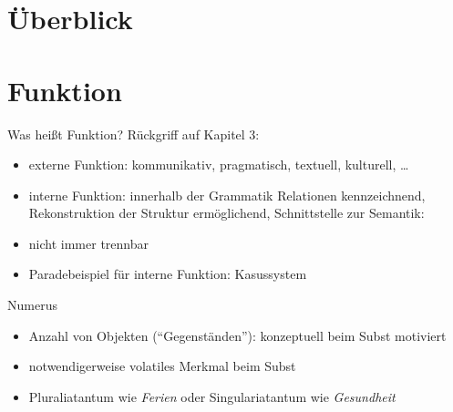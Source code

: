 \section{Überblick}

\section{Funktion}

\begin{frame}
  {Was heißt Funktion?}
  \pause
  Rückgriff auf Kapitel 3:
  \pause
  \Halbzeile
  \begin{itemize}[<+->]
    \item \alert{externe} Funktion: kommunikativ, pragmatisch, textuell, kulturell, \dots
    \item \alert{interne} Funktion: innerhalb der Grammatik Relationen kennzeichnend,
      Rekonstruktion der Struktur ermöglichend, Schnittstelle zur Semantik: 
    \item nicht immer trennbar
      \Halbzeile
    \item Paradebeispiel für interne Funktion: \alert{Kasussystem}
  \end{itemize}
\end{frame}

\begin{frame}
  {Numerus}
  \pause
  \begin{exe}
    \ex
    \begin{xlist}
      \pause
    \end{xlist}
    \pause
    \ex
    \begin{xlist}
      \pause
    \end{xlist}
  \end{exe}
  \pause
  \Halbzeile
  \begin{itemize}[<+->]
    \item \alert{Anzahl von Objekten ("`Gegenständen"')}: konzeptuell beim Subst motiviert
    \item notwendigerweise volatiles Merkmal beim Subst
    \item Pluraliatantum wie \textit{Ferien} oder Singulariatantum wie \textit{Gesundheit}
  \end{itemize}
\end{frame}

